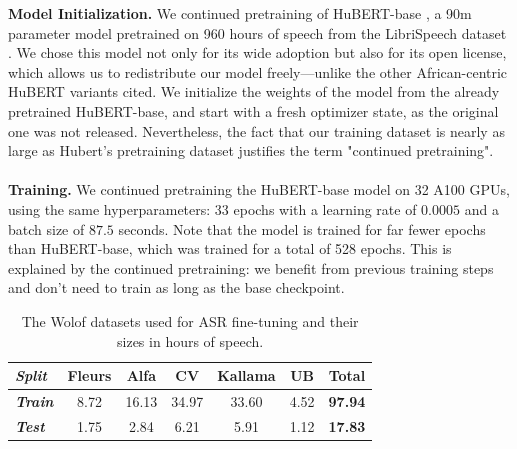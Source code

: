 \documentclass{article}
\newcommand{\myparagraph}[1]{\noindent\textbf{#1}}
\begin{document}
\myparagraph{Model Initialization.} We continued pretraining of HuBERT-base \cite{hubert}, a 90m parameter model pretrained on 960 hours of speech from the LibriSpeech dataset \cite{librispeech}. We chose this model not only for its wide adoption but also for its open license, which allows us to redistribute our model freely—unlike the other African-centric HuBERT variants cited. We initialize the weights of the model from the already pretrained HuBERT-base, and start with a fresh optimizer state, as the original one was not released. Nevertheless, the fact that our training dataset is nearly as large as Hubert's pretraining dataset justifies the term "continued pretraining".
\\
\\
\myparagraph{Training.} We continued pretraining the HuBERT-base model on 32 A100 GPUs, using the same hyperparameters: 33 epochs with a learning rate of $0.0005$ and a batch size of $87.5$ seconds. Note that the model is trained for far fewer epochs than HuBERT-base, which was trained for a total of 528 epochs. This is explained by the continued pretraining: we benefit from previous training steps and don't need to train as long as the base checkpoint.
\begin{table}[ht]
    \centering
    {\small{
    \begin{tabular}{lcccccc}
        \toprule
        \textbf{\textit{Split}} & \textbf{Fleurs} & \textbf{Alfa} & \textbf{CV} & \textbf{Kallama} & \textbf{UB} & \textbf{Total} \\
        \midrule
        \textbf{\textit{Train}} & 8.72 & 16.13 & 34.97 & 33.60 & 4.52 & \textbf{97.94} \\
        \textbf{\textit{Test}} & 1.75 & 2.84 & 6.21 & 5.91 & 1.12 & \textbf{17.83} \\
        \bottomrule
    \end{tabular}
    }}
    \caption{The Wolof datasets used for ASR fine-tuning and their sizes in hours of speech.}
    \label{tab:asr_data}
\end{table}
\end{document}

